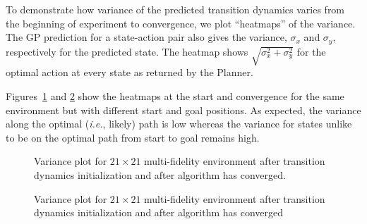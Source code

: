 \documentclass[12pt]{report}
\newcommand{\ie}{\textit{i.e.}}
\begin{document}
To demonstrate how variance of the predicted transition dynamics varies from the beginning of experiment to convergence, we plot ``heatmaps'' of the variance. The GP prediction for a state-action pair also gives the variance, $\sigma_x$ and $\sigma_y$, respectively for the predicted state. The heatmap shows $\sqrt{\sigma_x^2 + \sigma_y^2}$ for the optimal action at every state as returned by the Planner. 

Figures~\ref{fig:heatmap1} and \ref{fig:heatmap2} show the heatmaps at the start and convergence for the same environment but with different start and goal positions. As expected, the variance along the optimal (\ie, likely) path is low whereas the variance for states unlike to be on the optimal path from start to goal remains high. 

\begin{figure}
	\centering
	\caption{Variance plot for $21 \times 21$ multi-fidelity environment after transition dynamics initialization and after algorithm has converged.}
   \label{fig:heatmap1}
\end{figure}

\begin{figure}[htp]
	\centering 
	\caption{Variance plot for $21 \times 21$ multi-fidelity environment after transition dynamics initialization and after algorithm has converged}
   \label{fig:heatmap2}
\end{figure}
\end{document}
